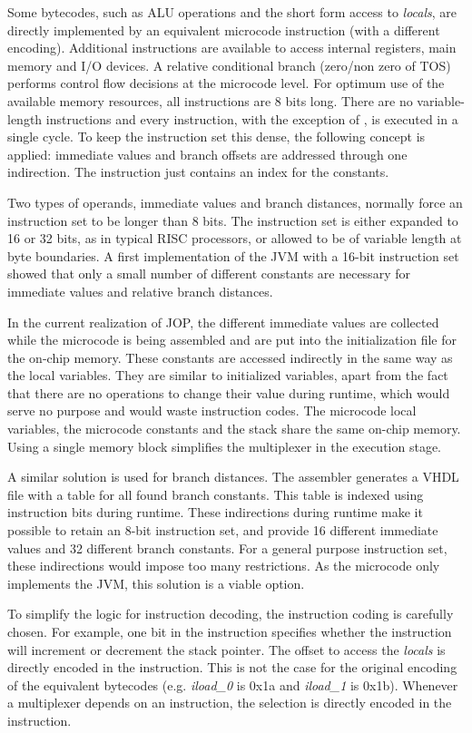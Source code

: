 Some bytecodes, such as ALU operations and the short form access to
\emph{locals}, are directly implemented by an equivalent microcode
instruction (with a different encoding). Additional instructions are
available to access internal registers, main memory and I/O devices.
A relative conditional branch (zero/non zero of TOS) performs control
flow decisions at the microcode level. For optimum use of the
available memory resources, all instructions are 8 bits long. There
are no variable-length instructions and every instruction, with the
exception of , is executed in a single cycle. To keep the
instruction set this dense, the following concept is applied:
immediate values and branch offsets are addressed through one
indirection. The instruction just contains an index for the
constants.

Two types of operands, immediate values and branch distances,
normally force an instruction set to be longer than 8 bits. The
instruction set is either expanded to 16 or 32 bits, as in typical
RISC processors, or allowed to be of variable length at byte
boundaries. A first implementation of the JVM with a 16-bit
instruction set showed that only a small number of different
constants are necessary for immediate values and relative branch
distances.

In the current realization of JOP, the different immediate values
are collected while the microcode is being assembled and are put
into the initialization file for the on-chip memory. These constants
are accessed indirectly in the same way as the local variables. They
are similar to initialized variables, apart from the fact that there
are no operations to change their value during runtime, which would
serve no purpose and would waste instruction codes.  The microcode
local variables, the microcode constants and the stack share the
same on-chip memory. Using a single memory block simplifies the
multiplexer in the execution stage.

A similar solution is used for branch distances. The assembler
generates a VHDL file with a table for all found branch constants.
This table is indexed using instruction bits during runtime. These
indirections during runtime make it possible to retain an 8-bit
instruction set, and provide 16 different immediate values and 32
different branch constants. For a general purpose instruction set,
these indirections would impose too many restrictions. As the
microcode only implements the JVM, this solution is a viable option.

To simplify the logic for instruction decoding, the instruction
coding is carefully chosen. For example, one bit in the instruction
specifies whether the instruction will increment or decrement the
stack pointer. The offset to access the \emph{locals} is directly
encoded in the instruction. This is not the case for the original
encoding of the equivalent bytecodes (e.g. \emph{iload\_0} is 0x1a
and \emph{iload\_1} is 0x1b). Whenever a multiplexer depends on an
instruction, the selection is directly encoded in the instruction.

